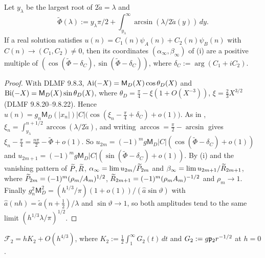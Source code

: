 \begin{lemma}\label{lem:reading}
Let $y_\lambda$ be the largest root of $2\tilde a=\lambda$ and
\[
  \tilde\Phi(\lambda):=y_\lambda\pi/2+\int_{y_\lambda}^\infty\arcsin(\lambda/2\tilde a(y))\,dy.
\]
If a real solution satisfies
$u(n)=C_1(n)\psi_A(n)+C_2(n)\psi_B(n)$ with $C(n)\to(C_1,C_2)\ne0$, then its coordinates
$(\alpha_\infty,\beta_\infty)$ of (i) are a positive multiple of
$(\cos(\tilde\Phi-\delta_C),\sin(\tilde\Phi-\delta_C))$, where $\delta_C:=\arg(C_1+iC_2)$.
\end{lemma}

\begin{proof}
With DLMF 9.8.3, $\operatorname{Ai}(-X)=\mathsf M_D(X)\cos\theta_D(X)$ and $\operatorname{Bi}(-X)=\mathsf M_D(X)\sin\theta_D(X)$, where
$\theta_D=\frac\pi4-\xi(1+O(X^{-3}))$, $\xi=\frac23X^{3/2}$ (DLMF 9.8.20--9.8.22). Hence
$u(n)=g_n\mathsf M_D(|x_n|)|C|\bigl(\cos(\xi_n-\frac\pi4+\delta_C)+o(1)\bigr)$. As in ,
$\xi_n=\int_{y_\lambda}^{n+1/2}\arccos(\lambda/2\tilde a)$, and writing $\arccos=\frac\pi2-\arcsin$ gives
$\xi_n-\frac\pi4=\frac{n\pi}2-\tilde\Phi+o(1)$. So $u_{2m}=(-1)^mg\mathsf M_D|C|(\cos(\tilde\Phi-\delta_C)+o(1))$
and $u_{2m+1}=(-1)^mg\mathsf M_D|C|(\sin(\tilde\Phi-\delta_C)+o(1))$. By (i) and the
vanishing pattern of $\widetilde P,\widetilde R$, $\alpha_\infty=\lim u_{2m}/\widetilde P_{2m}$ and $\beta_\infty=\lim u_{2m+1}/\widetilde R_{2m+1}$,
where $\widetilde P_{2m}=(-1)^m(\rho_m/A_m)^{1/2}$, $\widetilde R_{2m+1}=(-1)^m(\rho_mA_m)^{-1/2}$ and $\rho_m\to1$. Finally
$g_n^2\mathsf M_D^2=(h^{1/3}/\pi)(1+o(1))/(\hat a\sin\vartheta)$ with $\hat a(nh)=\tilde a(n+\frac12)/\lambda$ and
$\sin\vartheta\to1$, so both amplitudes tend to the same limit $(h^{1/3}\lambda/\pi)^{1/2}$.
\end{proof}

\begin{lemma}\label{lem:riemann}
$\mathcal F_2=hK_2+O(h^{4/3})$, where $K_2:=\frac12\int_1^\infty G_2(t)\,dt$ and
$G_2:=g\mathfrak{p}_2r^{-1/2}$ at $h=0$.
\end{lemma}

